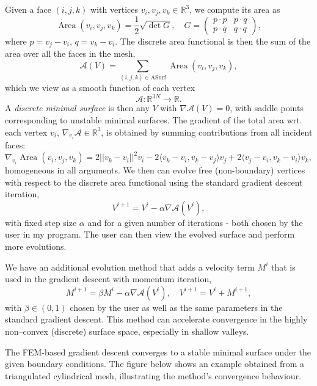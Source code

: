 \noindent Given a face $(i,j,k)$ with vertices $v_i, v_j, v_k \in \mathbb{R}^3$, we compute its area as
\[
\operatorname{Area}(v_i,v_j,v_k)
= \frac12 \sqrt{\det G},
\quad
G =
\begin{pmatrix}
p\cdot p & p\cdot q \\
p\cdot q & q\cdot q
\end{pmatrix},
\]
where $p = v_j - v_i$, $q = v_k - v_i$. The discrete area functional is then the sum of the area over all the faces in the mesh,
\[
\mathcal{A}(V) = \sum_{(i,j,k) \in \mathrm{ASurf}} \operatorname{Area}(v_i,v_j,v_k),
\]
which we view as a smooth function of each vertex
\[
\mathcal{A} : \mathbb{R}^{3N} \to \mathbb{R}.
\]
A \emph{discrete minimal surface} is then any $V$ with $\nabla \mathcal{A}(V) = 0$, with saddle points corresponding to unstable minimal surfaces. The gradient of the total area wrt. each vertex $v_i$, $\nabla_{v_i} \mathcal{A} \in \mathbb{R}^3$, is obtained by summing contributions from all incident faces:
\[
\nabla_{v_i} \operatorname{Area}(v_i,v_j,v_k)
= 2||v_k - v_i||^2v_i - 2\langle v_k-v_i, v_k-v_j\rangle v_j + 2\langle v_j-v_i, v_k-v_i \rangle v_k,
\]
homogeneous in all arguments. We then can evolve free (non-boundary) vertices with respect to the discrete area functional using the standard gradient descent iteration,
\[
V^{i+1} = V^i - \alpha \nabla \mathcal{A}(V^i),
\]
with fixed step size $\alpha$ and for a given number of iterations - both chosen by the user in my program. The user can then view the evolved surface and perform more evolutions.

\noindent We have an additional evolution method that adds a velocity term $M^i$ that is used in the gradient descent with momentum iteration,
\[
M^{i+1} = \beta M^i - \alpha \nabla \mathcal{A}(V^i),
\quad
V^{i+1} = V^i + M^{i+1},
\]
with $\beta \in (0,1)$ chosen by the user as well as the same parameters in the standard gradient descent. This method can accelerate convergence in the highly non--convex (discrete) surface space, especially in shallow valleys.

\noindent The FEM-based gradient descent converges to a stable minimal surface under the given boundary conditions. The figure below shows an example obtained from a triangulated cylindrical mesh, illustrating the method’s convergence behaviour.

